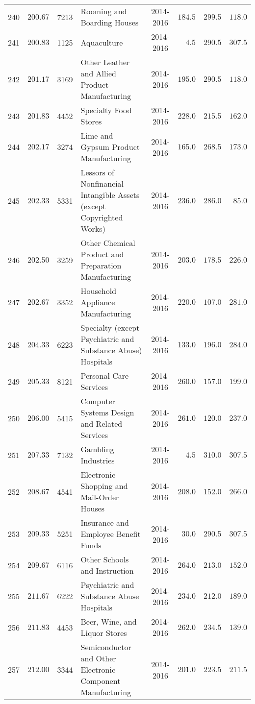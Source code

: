 \documentclass[9pt, oneside]{article}   	%
\begin{document}
\begin{longtable}{cccp{2.0in}cccc}
240  & $200.67$ & 7213 & Rooming and Boarding Houses & 2014-2016 & $184.5$ & $299.5$ & $118.0$ \\
241  & $200.83$ & 1125 & Aquaculture & 2014-2016 & $\phantom{00}4.5$ & $290.5$ & $307.5$ \\
242  & $201.17$ & 3169 & Other Leather and Allied Product Manufacturing & 2014-2016 & $195.0$ & $290.5$ & $118.0$ \\
243  & $201.83$ & 4452 & Specialty Food Stores & 2014-2016 & $228.0$ & $215.5$ & $162.0$ \\
244  & $202.17$ & 3274 & Lime and Gypsum Product Manufacturing & 2014-2016 & $165.0$ & $268.5$ & $173.0$ \\
245  & $202.33$ & 5331 & Lessors of Nonfinancial Intangible Assets (except Copyrighted Works) & 2014-2016 & $236.0$ & $286.0$ & $\phantom{0}85.0$ \\
246  & $202.50$ & 3259 & Other Chemical Product and Preparation Manufacturing & 2014-2016 & $203.0$ & $178.5$ & $226.0$ \\
247  & $202.67$ & 3352 & Household Appliance Manufacturing & 2014-2016 & $220.0$ & $107.0$ & $281.0$ \\
248  & $204.33$ & 6223 & Specialty (except Psychiatric and Substance Abuse) Hospitals & 2014-2016 & $133.0$ & $196.0$ & $284.0$ \\
249  & $205.33$ & 8121 & Personal Care Services & 2014-2016 & $260.0$ & $157.0$ & $199.0$ \\
250  & $206.00$ & 5415 & Computer Systems Design and Related Services & 2014-2016 & $261.0$ & $120.0$ & $237.0$ \\
251  & $207.33$ & 7132 & Gambling Industries & 2014-2016 & $\phantom{00}4.5$ & $310.0$ & $307.5$ \\
252  & $208.67$ & 4541 & Electronic Shopping and Mail-Order Houses & 2014-2016 & $208.0$ & $152.0$ & $266.0$ \\
253  & $209.33$ & 5251 & Insurance and Employee Benefit Funds & 2014-2016 & $\phantom{0}30.0$ & $290.5$ & $307.5$ \\
254  & $209.67$ & 6116 & Other Schools and Instruction & 2014-2016 & $264.0$ & $213.0$ & $152.0$ \\
255  & $211.67$ & 6222 & Psychiatric and Substance Abuse Hospitals & 2014-2016 & $234.0$ & $212.0$ & $189.0$ \\
256  & $211.83$ & 4453 & Beer, Wine, and Liquor Stores & 2014-2016 & $262.0$ & $234.5$ & $139.0$ \\
257  & $212.00$ & 3344 & Semiconductor and Other Electronic Component Manufacturing & 2014-2016 & $201.0$ & $223.5$ & $211.5$ \\

\end{longtable}
\end{document}
